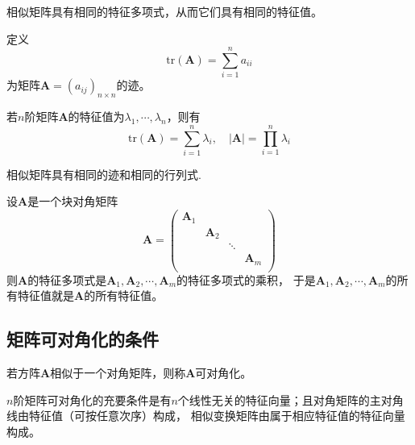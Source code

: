 \begin{theorem}
    相似矩阵具有相同的特征多项式，从而它们具有相同的特征值。
\end{theorem}

\begin{definition}[迹]
    定义$$\mathrm{tr}(\boldsymbol{A})=\sum_{i=1}^n a_{ii}$$
    为矩阵$\boldsymbol{A}=(a_{ij})_{n\times n}$的迹。
\end{definition}

\begin{theorem}
    若$n$阶矩阵$\boldsymbol{A}$的特征值为$\lambda_1,\cdots,\lambda_n$，则有
    $$\mathrm{tr}(\boldsymbol{A})=\sum_{i=1}^n \lambda_i,\quad |\boldsymbol{A}|=\prod_{i=1}^n \lambda_i$$
\end{theorem}

\begin{theorem}
    相似矩阵具有相同的迹和相同的行列式.
\end{theorem}

\begin{theorem}
    设$\boldsymbol{A}$是一个块对角矩阵
    $$\boldsymbol{A}=\left(\begin{array}{cccc}
        \boldsymbol{A}_1 & & & \\
         & \boldsymbol{A}_2& & \\
         & & \ddots & \\
         & & & \boldsymbol{A}_m\\
    \end{array}\right)$$
    则$\boldsymbol{A}$的特征多项式是$\boldsymbol{A}_1,\boldsymbol{A}_2,\cdots,\boldsymbol{A}_m$的特征多项式的乘积，
    于是$\boldsymbol{A}_1,\boldsymbol{A}_2,\cdots,\boldsymbol{A}_m$的所有特征值就是$\boldsymbol{A}$的所有特征值。
\end{theorem}

\subsection{矩阵可对角化的条件}
\begin{definition}[可对角化]
    若方阵$\boldsymbol{A}$相似于一个对角矩阵，则称$\boldsymbol{A}${\heiti 可对角化}。
\end{definition}

\begin{theorem}
    $n$阶矩阵可对角化的充要条件是有$n$个线性无关的特征向量；且对角矩阵的主对角线由特征值（可按任意次序）构成，
    相似变换矩阵由属于相应特征值的特征向量构成。
\end{theorem}

